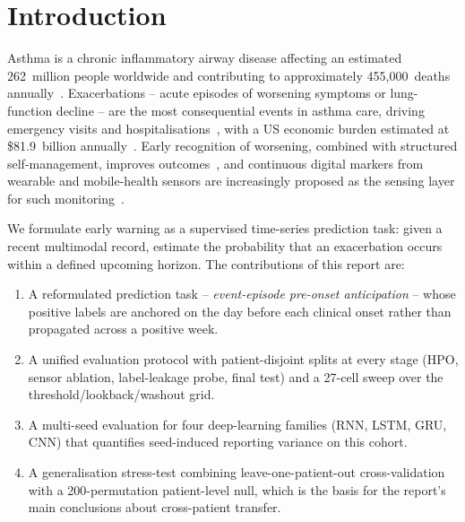 \documentclass[11pt,a4paper]{article}
\begin{document}
\section{Introduction}\label{sec:intro}

Asthma is a chronic inflammatory airway disease affecting an estimated
262~million people worldwide and contributing to approximately
455{,}000~deaths annually~\cite{who2024}.  Exacerbations -- acute
episodes of worsening symptoms or lung-function decline -- are the
most consequential events in asthma care, driving emergency visits and
hospitalisations~\cite{bourdin2019}, with a US economic burden estimated
at \$81.9~billion annually~\cite{nurmagambetov2018}.  Early recognition
of worsening, combined with structured self-management, improves
outcomes~\cite{pinnock2015}, and continuous digital markers from
wearable and mobile-health sensors are increasingly proposed as the
sensing layer for such monitoring~\cite{cokorudy2024,taylor2020}.

We formulate early warning as a supervised time-series prediction
task: given a recent multimodal record, estimate the probability that
an exacerbation occurs within a defined upcoming horizon.  The
contributions of this report are:

\begin{enumerate}[nosep,leftmargin=*]
  \item A reformulated prediction task -- \emph{event-episode
        pre-onset anticipation} -- whose positive labels are anchored
        on the day before each clinical onset rather than propagated
        across a positive week.
  \item A unified evaluation protocol with patient-disjoint splits at
        every stage (HPO, sensor ablation, label-leakage probe, final
        test) and a 27-cell sweep over the
        threshold/lookback/washout grid.
  \item A multi-seed evaluation for four deep-learning families
        (RNN, LSTM, GRU, CNN) that quantifies seed-induced
        reporting variance on this cohort.
  \item A generalisation stress-test combining leave-one-patient-out
        cross-validation with a 200-permutation patient-level null,
        which is the basis for the report's main conclusions about
        cross-patient transfer.
\end{enumerate}

\end{document}
